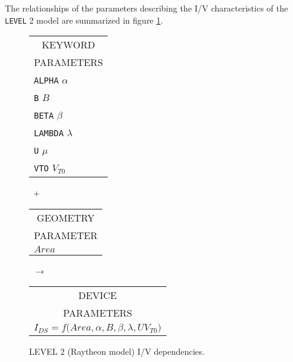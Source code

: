 The relationships of the parameters describing the I/V
characteristics of the {\tt LEVEL} 2 model are summarized in figure
\ref{blevel2i/v}.\\[0.1in]
\begin{figure}[h]
\begin{tabular}[t]{|p{1in}|}
\hline
\multicolumn{1}{|c|}{KEYWORD} \\
\multicolumn{1}{|c|}{PARAMETERS} \\
\hline
\hline
{\tt ALPHA} \hfill $\alpha$\\
{\tt B} \hfill $B$\\
{\tt BETA} \hfill $\beta$\\
{\tt LAMBDA} \hfill $\lambda$\\
{\tt U} \hfill $\mu$\\
{\tt VTO} \hfill $V_{T0}$\\
\hline
\end{tabular}
\hfill
\parbox{0.2in}{\ \vspace*{0.2in}\newline +}
\hfill
\begin{tabular}[t]{|p{1in}|}
\hline
\multicolumn{1}{|c|}{GEOMETRY} \\
\multicolumn{1}{|c|}{PARAMETER} \\
\hline
\hspace*{\fill}$Area$\\
\hline
\end{tabular}
\hfill
\parbox{0.2in}{\ \vspace*{0.2in}\newline $\rightarrow$}
\hfill
\begin{tabular}[t]{|p{1.8in}|}
\hline
\multicolumn{1}{|c|}{DEVICE} \\
\multicolumn{1}{|c|}{PARAMETERS} \\
\hline
$I_{DS} = f(Area, \alpha, $\newline\hspace*{\fill}$
B, \beta, \lambda, U V_{T0})$\\
\hline
\end{tabular}
\caption{LEVEL 2 (Raytheon model) I/V dependencies. \label{blevel2i/v}}
\end{figure}

